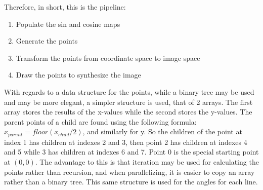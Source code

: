Therefore, in short, this is the pipeline:
\begin{enumerate}
	\item Populate the sin and cosine maps
	\item Generate the points
	\item Transform the points from coordinate space to image space
	\item Draw the points to synthesize the image
\end{enumerate}


With regards to a data structure for the points, while a binary tree may be used and may be more elegant, a simpler structure is used, that of 2 arrays. The first array stores the results of the x-values while the second stores the y-values. The parent points of a child are found using the following formula: $x_{parent} = floor(x_{child}/2)$, and similarly for y. So the children of the point at index 1 has children at indexes 2 and 3, then point 2 has children at indexes 4 and 5 while 3 has children at indexes 6 and 7. Point 0 is the special starting point at $(0, 0)$. The advantage to this is that iteration may be used for calculating the points rather than recursion, and when parallelizing, it is easier to copy an array rather than a binary tree. This same structure is used for the angles for each line.